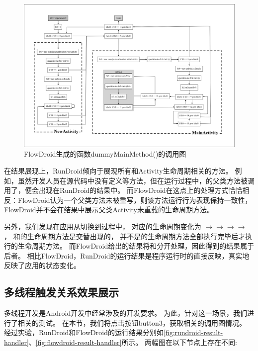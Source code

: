 \begin{figure}[ht]
	\centering
	\includegraphics[width=\textwidth]{./Figures/flowdroid-dummyMainMethod.png}
	\caption{FlowDroid生成的函数dummyMainMethod()的调用图}
	\label{fig:flowdroid-result-lifecycle}
\end{figure}

在结果展现上，RunDroid倾向于展现所有和Activity生命周期相关的方法。
例如，虽然开发人员在源代码中没有定义等方法，但在运行过程中，的父类方法被调用了，便会出现在RunDroid的结果中。
而FlowDroid在这点上的处理方式恰恰相反：FlowDroid认为一个父类方法未被重写，则该方法运行行为表现保持一致性，FlowDroid并不会在结果中展示父类Activity未重载的生命周期方法。



另外，我们发现在应用从切换到过程中，
对应的生命周期变化为 $\to$$\to$$\to$$\to$ ，
和的生命周期方法是交替出现的，
并不是的生命周期方法全部执行完毕后才执行的生命周期方法。
而FlowDroid给出的结果将和分开处理，因此得到的结果属于后者。
相比FlowDroid，RunDroid的运行结果是程序运行时的直接反映，真实地反映了应用的状态变化。


\subsection{多线程触发关系效果展示}

多线程开发是Android开发中经常涉及的开发要求。
为此，针对这一场景，我们进行了相关的测试。
在本节，我们将点击按钮button3，获取相关的调用图情况。
经过实验，RunDroid和FlowDroid的运行结果分别如\autoref{fig:rundroid-result-handler}、\autoref{fig:flowdroid-result-handler}所示。
两幅图在以下节点上存在不同:





